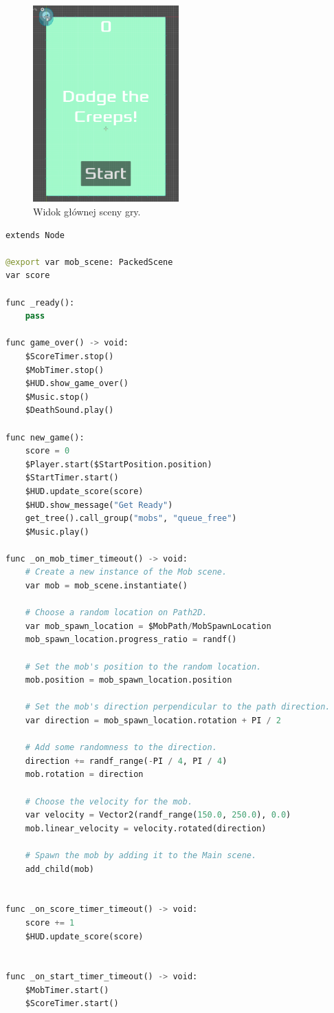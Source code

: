\documentclass[a4paper,12pt]{article}
\begin{document}
\begin{figure}[h]
    \centering
    \includegraphics[width=0.5\textwidth]{main.png}
    \caption{Widok głównej sceny gry.}
    \label{fig:main1}
\end{figure}

\begin{lstlisting}[language=Python]
extends Node

@export var mob_scene: PackedScene
var score

func _ready():
	pass

func game_over() -> void:
	$ScoreTimer.stop()
	$MobTimer.stop()
	$HUD.show_game_over()
	$Music.stop()
	$DeathSound.play()

func new_game():
	score = 0
	$Player.start($StartPosition.position)
	$StartTimer.start()
	$HUD.update_score(score)
	$HUD.show_message("Get Ready")
	get_tree().call_group("mobs", "queue_free")
	$Music.play()

func _on_mob_timer_timeout() -> void:
	# Create a new instance of the Mob scene.
	var mob = mob_scene.instantiate()

	# Choose a random location on Path2D.
	var mob_spawn_location = $MobPath/MobSpawnLocation
	mob_spawn_location.progress_ratio = randf()

	# Set the mob's position to the random location.
	mob.position = mob_spawn_location.position

	# Set the mob's direction perpendicular to the path direction.
	var direction = mob_spawn_location.rotation + PI / 2

	# Add some randomness to the direction.
	direction += randf_range(-PI / 4, PI / 4)
	mob.rotation = direction

	# Choose the velocity for the mob.
	var velocity = Vector2(randf_range(150.0, 250.0), 0.0)
	mob.linear_velocity = velocity.rotated(direction)

	# Spawn the mob by adding it to the Main scene.
	add_child(mob)


func _on_score_timer_timeout() -> void:
	score += 1
	$HUD.update_score(score)


func _on_start_timer_timeout() -> void:
	$MobTimer.start()
	$ScoreTimer.start()
\end{lstlisting}
\end{document}
